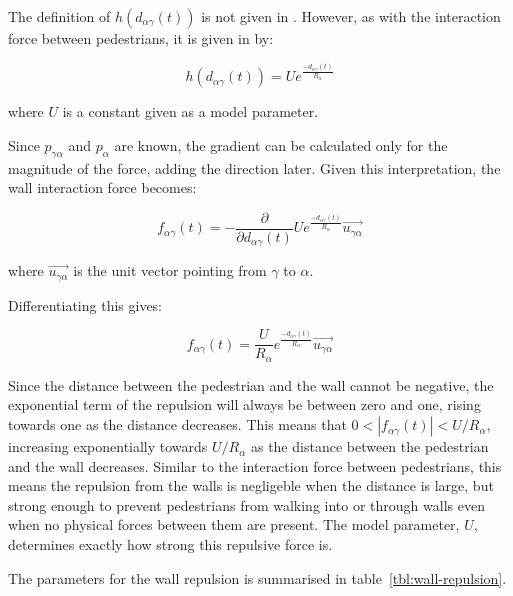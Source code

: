 The definition of $h\left( d_{\alpha \gamma}(t) \right)$ is not given in
\cite{self-org}. However, as with the interaction force between pedestrians,
it is given in \cite{ABconstant} by:

\begin{equation}
    h \left( d_{\alpha \gamma}(t) \right) =
    U e^{\frac{- d_{\alpha \gamma}(t) }{ R_{\alpha} }}
\end{equation}

where $U$ is a constant given as a model parameter.

Since $p_{\gamma \alpha}$ and $p_\alpha$ are known, the gradient can be
calculated only for the magnitude of the force, adding the direction later.
Given this interpretation, the wall interaction force becomes:


\begin{equation}
    f_{\alpha \gamma}(t) =
    -\frac{\partial}{\partial d_{\alpha \gamma}(t)}U e^{\frac{- d_{\alpha
    \gamma}(t) }{ R_{\alpha} }} \overrightarrow{u_{\gamma \alpha}}
\end{equation}

where $\overrightarrow{u_{\gamma \alpha}}$ is the unit vector pointing from
$\gamma$ to $\alpha$.

Differentiating this gives:

\begin{equation}
    f_{\alpha \gamma}(t) =
    \frac{U}{R_\alpha}
    e^{\frac{- d_{\alpha \gamma}(t) }{ R_{\alpha} }}
    \overrightarrow{u_{\gamma \alpha}}
    \label{eqn:wall-repulsion}
\end{equation}

Since the distance between the pedestrian and the wall cannot be negative, the
exponential term of the repulsion will always be between zero and one, rising
towards one as the distance decreases. This means that $0 < |f_{\alpha
\gamma}(t)| < U/R_\alpha$, increasing exponentially towards $U/R_\alpha$ as
the distance between the pedestrian and the wall decreases. Similar to the
interaction force between pedestrians, this means the repulsion from the walls
is negligeble when the distance is large, but strong enough to prevent
pedestrians from walking into or through walls even when no physical forces 
between them are present. The model parameter, $U$, determines exactly 
how strong this repulsive force is.

The parameters for the wall repulsion is summarised in
table~\ref{tbl:wall-repulsion}.

